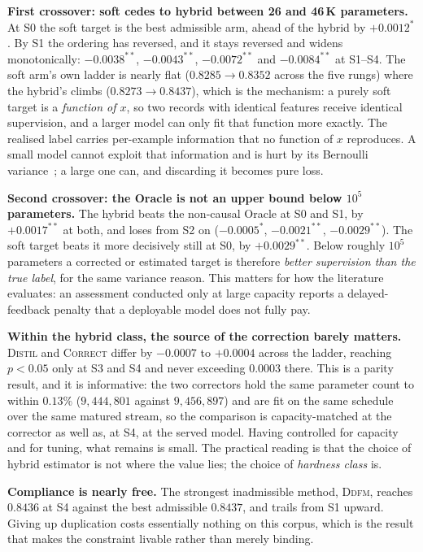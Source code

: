 \documentclass[runningheads]{llncs}
\begin{document}
\smallskip\noindent\textbf{First crossover: soft cedes to hybrid between 26 and 46\,K parameters.}
At S0 the soft target is the best admissible arm, ahead of the hybrid by
$+0.0012^{\ast}$. By S1 the ordering has reversed, and it stays reversed and widens monotonically:
$-0.0038^{\ast\ast}$, $-0.0043^{\ast\ast}$, $-0.0072^{\ast\ast}$ and $-0.0084^{\ast\ast}$ at
S1--S4. The soft arm's own ladder is nearly flat ($0.8285 \to 0.8352$ across the five rungs) where
the hybrid's climbs ($0.8273 \to 0.8437$), which is the mechanism: a purely soft target is a
\emph{function of $x$}, so two records with identical features receive identical supervision, and a
larger model can only fit that function more exactly. The realised label carries per-example
information that no function of $x$ reproduces. A small model cannot exploit that information and
is hurt by its Bernoulli variance~\cite{menon2021statistical}; a large one can, and discarding it
becomes pure loss.

\smallskip\noindent\textbf{Second crossover: the Oracle is not an upper bound below $10^{5}$
parameters.} The hybrid beats the non-causal Oracle at S0 and S1, by $+0.0017^{\ast\ast}$ at both,
and loses from S2 on ($-0.0005^{\ast}$, $-0.0021^{\ast\ast}$, $-0.0029^{\ast\ast}$). The soft
target beats it more decisively still at S0, by $+0.0029^{\ast\ast}$. Below roughly $10^{5}$
parameters a corrected or estimated target is therefore \emph{better supervision than the true
label}, for the same variance reason. This matters for how the literature evaluates: an assessment
conducted only at large capacity reports a delayed-feedback penalty that a deployable model does
not fully pay.

\smallskip\noindent\textbf{Within the hybrid class, the source of the correction barely matters.}
\textsc{Distil} and \textsc{Correct} differ by $-0.0007$ to $+0.0004$ across the ladder, reaching
$p<0.05$ only at S3 and S4 and never exceeding $0.0003$ there. This is a parity result, and it is
informative: the two correctors hold the same parameter count to within $0.13\%$
($9{,}444{,}801$ against $9{,}456{,}897$) and are fit on the same schedule over the same matured
stream, so the comparison is capacity-matched at the corrector as well as, at S4, at the served
model. Having controlled for capacity and for tuning, what remains is small. The practical reading
is that the choice of hybrid estimator is not where the value lies; the choice of \emph{hardness
class} is.

\smallskip\noindent\textbf{Compliance is nearly free.} The strongest inadmissible method,
\textsc{Ddfm}, reaches $0.8436$ at S4 against the best admissible $0.8437$, and trails from S1
upward. Giving up duplication costs essentially nothing on this corpus, which is the result that
makes the constraint livable rather than merely binding.
\end{document}
